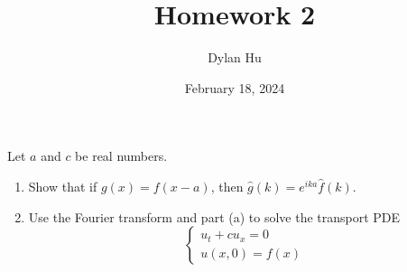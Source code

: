 \documentclass[plain]{pset}
\title{Homework 2}
\author{Dylan Hu}
\date{February 18, 2024}
\begin{document}
\maketitle

\pagebreak

\begin{problem}
Let \(a\) and \(c\) be real numbers.
\begin{enumerate}[label = (\alph*)]
    \item Show that if \(g(x) = f(x - a)\), then \(\hat{g}(k) = e^{ika}\hat{f}(k)\).
    \item Use the Fourier transform and part (a) to solve the transport PDE
          \[
              \begin{cases}
                  u_t + cu_x = 0 \\
                  u(x, 0) = f(x)
              \end{cases}
          \]
\end{enumerate}
\end{problem}
\end{document}
